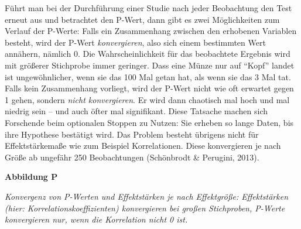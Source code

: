\documentclass[
  letterpaper,
  DIV=11,
  numbers=noendperiod]{scrreprt}
\begin{document}
Führt man bei der Durchführung einer Studie nach jeder Beobachtung den
Test erneut aus und betrachtet den P-Wert, dann gibt es zwei
Möglichkeiten zum Verlauf der P-Werte: Falls ein Zusammenhang zwischen
den erhobenen Variablen besteht, wird der P-Wert \emph{konvergieren},
also sich einem bestimmten Wert annähern, nämlich 0. Die
Wahrscheinlichkeit für das beobachtete Ergebnis wird mit größerer
Stichprobe immer geringer. Dass eine Münze nur auf ``Kopf'' landet ist
ungewöhnlicher, wenn sie das 100 Mal getan hat, als wenn sie das 3 Mal
tat. Falls kein Zusammenhang vorliegt, wird der P-Wert nicht wie oft
erwartet gegen 1 gehen, sondern \emph{nicht konvergieren}. Er wird dann
chaotisch mal hoch und mal niedrig sein -- und auch öfter mal
signifikant. Diese Tatsache machen sich Forschende beim optionalen
Stoppen zu Nutzen: Sie erheben so lange Daten, bis ihre Hypothese
bestätigt wird. Das Problem besteht übrigens nicht für Effektstärkemaße
wie zum Beispiel Korrelationen. Diese konvergieren je nach Größe ab
ungefähr 250 Beobachtungen (Schönbrodt \& Perugini, 2013).

\textbf{Abbildung P}

\emph{Konvergenz von P-Werten und Effektstärken je nach Effektgröße:
Effektstärken (hier: Korrelationskoeffizienten) konvergieren bei großen
Stichproben, P-Werte konvergieren nur, wenn die Korrelation nicht 0
ist.}
\end{document}

